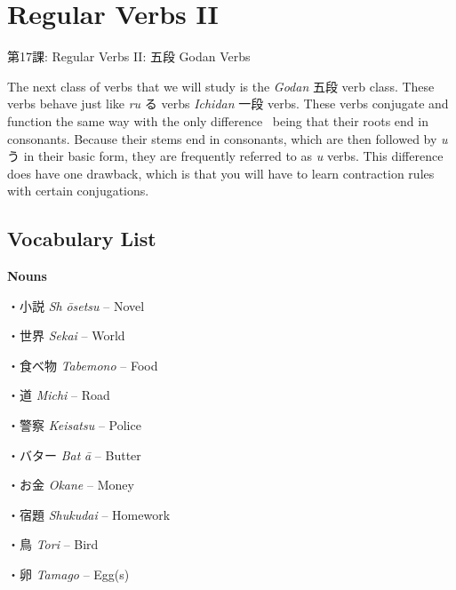     
\chapter{Regular Verbs II}

\begin{center}
\begin{Large}
第17課: Regular Verbs II: 五段 Godan Verbs 
\end{Large}
\end{center}
 
\par{ The next class of verbs that we will study is the \emph{Godan }五段 verb class. These verbs behave just like \emph{ru }る verbs \emph{Ichidan }一段 verbs. These verbs conjugate and function the same way with the only difference  being that their roots end in consonants. Because their stems end in consonants, which are then followed by \emph{u }う in their basic form, they are frequently referred to as \emph{u }verbs. This difference does have one drawback, which is that you will have to learn contraction rules with certain conjugations. }
      
\section{Vocabulary List}
 
\par{\textbf{Nouns }}
 
\par{・小説 \emph{Sh }\emph{ōsetsu }– Novel }
 
\par{・世界 \emph{Sekai }– World }
 
\par{・食べ物 \emph{Tabemono }– Food }
 
\par{・道 \emph{Michi }– Road }
 
\par{・警察 \emph{Keisatsu }– Police }
 
\par{・バター \emph{Bat }\emph{ā }– Butter }
 
\par{・お金 \emph{Okane }– Money }
 
\par{・宿題 \emph{Shukudai }– Homework }
 
\par{・鳥 \emph{Tori }– Bird }
 
\par{・卵 \emph{Tamago }– Egg(s) }
 
